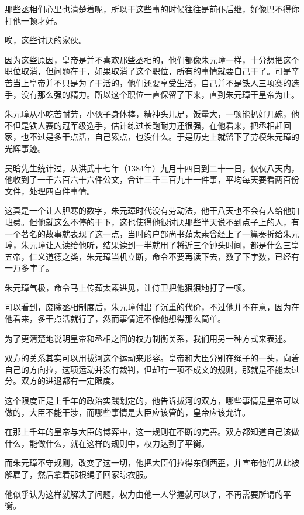 \begin{multicols}{\theparacolNo}
		那些丞相们心里也清楚着呢，所以干这些事的时候往往是前仆后继，好像巴不得你打他一顿才好。

		唉，这些讨厌的家伙。

		因为这些原因，皇帝是并不喜欢那些丞相的，他们都像朱元璋一样，十分想把这个职位取消，但问题在于，如果取消了这个职位，所有的事情就要自己干了。可是辛苦当上皇帝并不只是为了干活的，他们还要享受生活，自己并不是铁人三项赛的选手，没有那么强的精力。所以这个职位一直保留了下来，直到朱元璋干皇帝为止。

		朱元璋从小吃苦耐劳，小伙子身体棒，精神头儿足，饭量大，一顿能扒好几碗，他不但是铁人赛的冠军级选手，估计练过长跑耐力还很强，在他看来，把丞相赶回家，也不过是多干点活，自己累点，也没什么。于是历史上就留下了劳模朱元璋的光辉事迹。

		吴晗先生统计过，从洪武十七年（1384年）九月十四日到二十一日，仅仅八天内，他收到了一千六百六十六件公文，合计三千三百九十一件事，平均每天要看两百份文件，处理四百件事情。

		这真是一个让人胆寒的数字，朱元璋时代没有劳动法，他干八天也不会有人给他加班费。但他就这么不停的干下，这也使得他很讨厌那些半天说不到点子上的人，有一个著名的故事就表现了这一点，当时的户部尚书茹太素曾经上了一篇奏折给朱元璋，朱元璋让人读给他听，结果读到一半就用了将近三个钟头时间，都是什么三皇五帝，仁义道德之类，朱元璋当机立断，命令不要再读下去，数了下字数，已经有一万多字了。

		朱元璋气极，命令马上传茹太素进见，让侍卫把他狠狠地打了一顿。

		可以看到，废除丞相制度后，朱元璋付出了沉重的代价，不过他并不在意，因为在他看来，多干点活就行了，然而事情远不像他想得那么简单。

		为了更清楚地说明皇帝和丞相之间的权力制衡关系，我们用另一种方式来表述。

		双方的关系其实可以用拔河这个运动来形容。皇帝和大臣分别在绳子的一头，向着自己的方向拉，这项运动并没有裁判，但却有一项不成文的规则，那就是不能太过分。双方的进退都有一定限度。

		这个限度正是上千年的政治实践划定的，他告诉拔河的双方，哪些事情是皇帝可以做的，大臣不能干涉，而哪些事情是大臣应该管的，皇帝应该允许。

		在那上千年的皇帝与大臣的博弈中，这一规则在不断的完善。双方都知道自己该做什么，能做什么，就在这样的规则中，权力达到了平衡。

		而朱元璋不守规则，改变了这一切，他把大臣们拉得东倒西歪，并宣布他们从此被解雇了，然后拿着那根绳子回家晾衣服。

		他似乎认为这样就解决了问题，权力由他一人掌握就可以了，不再需要所谓的平衡。


\end{multicols}
